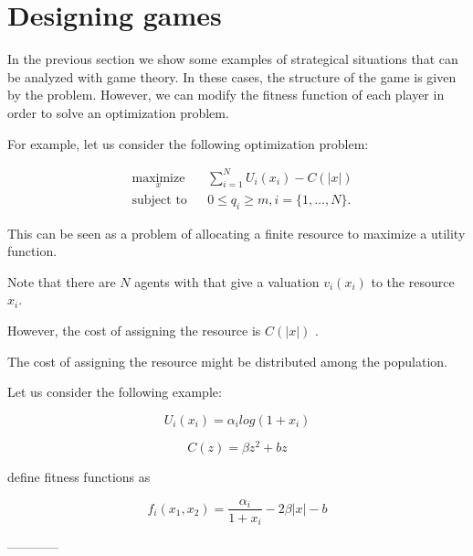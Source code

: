 \documentclass[a4paper,10pt]{article}
\begin{document}
\section{Designing games}

In the previous section we show some examples of strategical situations that can be analyzed with game theory. In these cases, the structure of the game is given by the problem. However, we can modify the fitness function of each player in order to solve an optimization problem.

For example, let us consider the following optimization problem:

\begin{equation}\label{eq:opt_problem}
\begin{aligned}
& \underset{x}{\text{maximize}} 
& & \sum_{i=1}^N U_i(x_i)  - C(|x|)\\
& \text{subject to}
& & 0 \leq q_i \geq m,  i =\{1,\ldots, N\}.
\end{aligned}
\end{equation}

This can be seen as a problem of allocating a finite resource to maximize a utility function. 

Note that there are $N$ agents with that give a valuation $v_i(x_i)$ to the resource $x_i$.

However, the cost of assigning the resource is $C(|x|)$ .

The cost of assigning the resource might be distributed among the population. 

Let us consider the following example:


\begin{equation}
U_i(x_i) =   \alpha_i  log(1+x_i) 
\end{equation}

\begin{equation}
C(z) = \beta z^2 + b z 
\end{equation}

define fitness functions as 

\begin{equation}
f_i(x_1, x_2) = \frac{\alpha_i}{1+x_i} - 2 \beta |x| - b 
\end{equation}














------------
\end{document}
